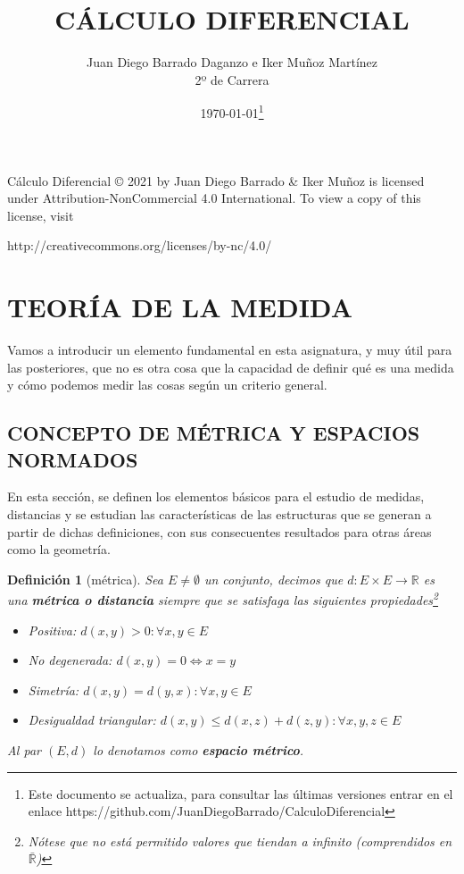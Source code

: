 \documentclass[10pt,a4paper,openright]{book}
\title{CÁLCULO DIFERENCIAL}
\author{Juan Diego Barrado Daganzo e Iker Muñoz Martínez\\2º de Carrera} %
\date{\today\footnote{Este documento se actualiza, para consultar las últimas versiones entrar en el enlace https://github.com/JuanDiegoBarrado/CalculoDiferencial}}
\theoremstyle{break}
\newtheorem*{defi}{Definición}
\begin{document}
\maketitle

Cálculo Diferencial © 2021 by Juan Diego Barrado \& Iker Muñoz is licensed under Attribution-NonCommercial 4.0 International. To view a copy of this license, visit
\begin{center}
http://creativecommons.org/licenses/by-nc/4.0/
\end{center}
\mainmatter


\chapter*{TEORÍA DE LA MEDIDA}
Vamos a introducir un elemento fundamental en esta asignatura, y muy útil para las posteriores, que no es otra cosa que la capacidad de definir qué es una medida y cómo podemos medir las cosas según un criterio general.

\section*{CONCEPTO DE MÉTRICA Y ESPACIOS NORMADOS}
En esta sección, se definen los elementos básicos para el estudio de medidas, distancias y se estudian las características de las estructuras que se generan a partir de dichas definiciones, con sus consecuentes resultados para otras áreas como la geometría.

\begin{defi}[métrica]
Sea $E\neq \emptyset$ un conjunto, decimos que $d: E\times E \rightarrow \mathbb R$ es una \textbf{métrica o distancia} siempre que se satisfaga las siguientes propiedades\footnote{Nótese que no está permitido valores que tiendan a infinito (comprendidos en $\bar{\mathbb R}$)}
\begin{itemize}
\item Positiva: $d(x,y)>0: \forall x, y \in E$
\item No degenerada: $d(x,y) = 0 \Leftrightarrow x = y$
\item Simetría: $d(x,y) = d(y,x): \forall x,y \in E$
\item Desigualdad triangular: $d(x,y)\leq d(x,z)+ d(z,y): \forall x,y,z\in E$
\end{itemize}

Al par $(E,d)$ lo denotamos como \textbf{espacio métrico}.

\end{defi}
\end{document}
